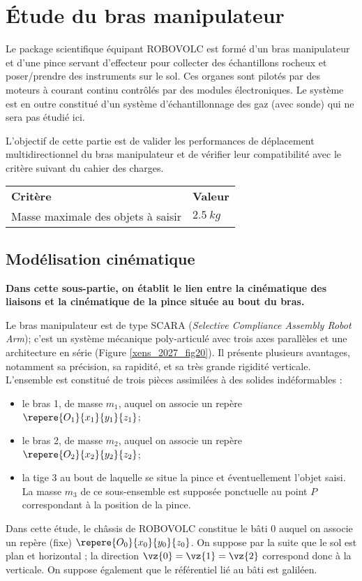 \section{Étude du bras manipulateur}
 Le package scientifique équipant ROBOVOLC est formé d'un bras manipulateur et d'une pince
 servant d'effecteur pour collecter des échantillons rocheux et poser/prendre des instruments sur le
 sol. Ces organes sont pilotés par des moteurs à courant continu contrôlés par des modules
 électroniques. Le système est en outre constitué d'un système d'échantillonnage des gaz (avec
 sonde) qui ne sera pas étudié ici. 
 
 \begin{obj}
 L'objectif de cette partie est de valider les performances de déplacement multidirectionnel
 du bras manipulateur et de vérifier leur compatibilité avec le critère suivant du cahier des
 charges.
 
 \begin{center}
 \begin{tabular}{ll}
 \textbf{Critère} & \textbf{Valeur} \\
Masse maximale des objets à saisir & $\SI{2,5}{kg}$ \\
 \end{tabular}
 \end{center}
 \end{obj}
 
 \subsection{Modélisation cinématique}
\textbf{ Dans cette sous-partie, on établit le lien entre la cinématique des liaisons et la cinématique
 de la pince située au bout du bras. }
 
Le bras manipulateur est de type SCARA (\textit{Selective Compliance Assembly Robot Arm}); c'est un
 système mécanique poly-articulé avec trois axes parallèles et une architecture en série (Figure
 \ref{xens_2027_fig20}). Il présente plusieurs avantages, notamment sa précision, sa rapidité, et sa très grande rigidité verticale. 
L'ensemble est constitué de trois pièces assimilées à des solides indéformables :
\begin{itemize}
\item le bras 1, de masse $m_1$, auquel on associe un repère $\repere{O_1}{x_1}{y_1}{z_1}$;
\item le bras 2, de masse $m_2$, auquel on associe un repère $\repere{O_2}{x_2}{y_2}{z_2}$;
\item la tige 3 au bout de laquelle se situe la pince et éventuellement l'objet saisi. La masse $m_3$ de ce
 sous-ensemble est supposée ponctuelle au point $P$ correspondant à la position de la pince.
 \end{itemize}
 Dans cette étude, le châssis de ROBOVOLC constitue le bâti 0 auquel on associe un repère (fixe)
 $\repere{O_0}{x_0}{y_0}{z_0}$. On suppose par la suite que le sol est plan et horizontal ; la direction $\vz{0}=\vz{1}=\vz{2}$
 correspond donc à la verticale. On suppose également que le référentiel lié au bâti est galiléen.
 
